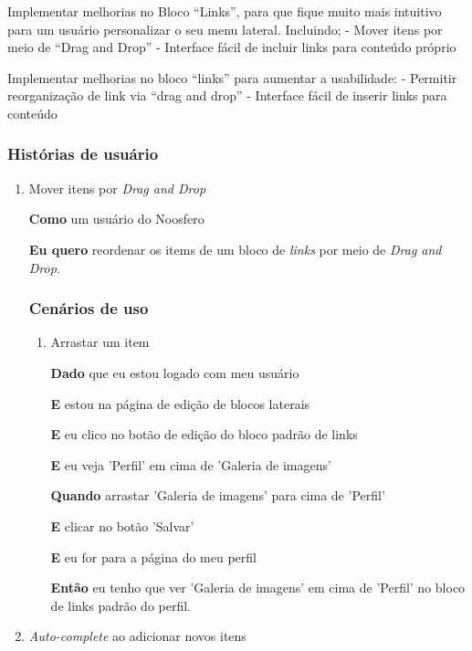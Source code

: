 
Implementar melhorias no Bloco ``Links'', para que fique muito mais intuitivo para um usuário personalizar o seu menu lateral. Incluindo;
- Mover itens por meio de ``Drag and Drop''
- Interface fácil de incluir links para conteúdo próprio

Implementar melhorias no bloco ``links'' para aumentar a usabilidade:
  - Permitir reorganização de link via ``drag and drop''
  - Interface fácil de inserir links para conteúdo

\subsubsection*{Histórias de usuário}

\begin{enumerate}

\item Mover itens por \textit{Drag and Drop}

\textbf{Como} um usuário do Noosfero

\textbf{Eu quero} reordenar os items de um bloco de \textit{links} por meio de
\textit{Drag and Drop}.

\subsubsection*{Cenários de uso}

\begin{enumerate}

\item Arrastar um item

\textbf{Dado} que eu estou logado com meu usuário

\textbf{E} estou na página de edição de blocos laterais

\textbf{E} eu clico no botão de edição do bloco padrão de links

\textbf{E} eu veja 'Perfil' em cima de 'Galeria de imagens'

\textbf{Quando} arrastar 'Galeria de imagens' para cima de 'Perfil'

\textbf{E} clicar no botão 'Salvar'

\textbf{E} eu for para a página do meu perfil

\textbf{Então} eu tenho que ver 'Galeria de imagens' em cima de 'Perfil'
no bloco de links padrão do perfil.

\end{enumerate}

\item \textit{Auto-complete} ao adicionar novos itens

\end{enumerate}

